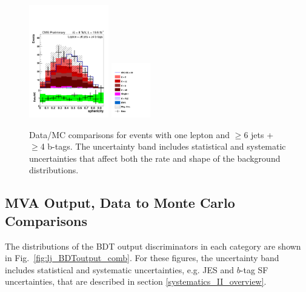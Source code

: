 \begin{figure}[hbtp]
\begin{center}
   \includegraphics[width=0.31\textwidth]{Figures/Analysis_2_Diagrams/LJ_plots_lep/6j4t/lep_sphericity_6j4t_cumulative_wRatio_noLegend_lin.pdf}
   \includegraphics[width=0.15\textwidth]{Figures/Analysis_2_Diagrams/LJ_plots_lep/ttH_legend_1columns.pdf}
   \caption{Data/MC comparisons for events with one lepton and $\ge$6 jets + $\ge$4 b-tags.  The uncertainty band includes statistical and systematic uncertainties that affect both the rate and shape of the background distributions.}
   \label{fig:lj_input_II_6j4t_2}
 \end{center}
\end{figure}

\clearpage




\subsection{MVA Output, Data to Monte Carlo Comparisons}
\label{mva_input_vars_data_to_mc_II_overview}

\par The distributions of the BDT output discriminators in each category are shown in
Fig.~\ref{fig:lj_BDToutput_comb}.  For these figures, the uncertainty band includes
statistical and systematic uncertainties, e.g. JES and $b$-tag SF
uncertainties, that are described in section \ref{systematics_II_overview}.

